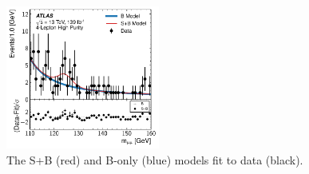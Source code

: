 {\begin{figure}[htp]
\includegraphics[width=0.45\textwidth]{figures/hmm/fitData2/ratio-4lep0-dat.pdf}
\caption{The S+B (red) and B-only (blue) models fit to data (black).}
\label{fig:hmmFits}
\end{figure}
\clearpage
}




